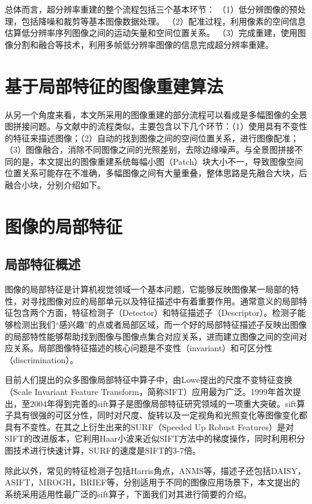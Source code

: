 总体而言，超分辨率重建的整个流程包括三个基本环节：
（1）低分辨图像的预处理，包括降噪和裁剪等基本图像数据处理。
（2）配准过程，利用像素的空间信息估算低分辨率序列图像之间的运动矢量和空间位置关系。
（3）完成重建，使用图像分割和融合等技术，利用多帧低分辨率图像的信息完成超分辨率重建。

\section{基于局部特征的图像重建算法}
从另一个角度来看，本文所采用的图像重建的部分流程可以看成是多幅图像的全景图拼接问题。与文献\cite{Brown:2006ir}中的流程类似，主要包含以下几个环节：（1）使用具有不变性的特征来描述图像；（2）自动的找到图像之间的空间位置关系，进行图像配准；（3）图像融合，消除不同图像之间的光照差别，去除边缘噪声。与全景图拼接不同的是，本文提出的图像重建系统每幅小图（Patch）块大小不一，导致图像空间位置关系可能存在不准确，多幅图像之间有大量重叠，整体思路是先融合大块，后融合小块，分别介绍如下。

\section{图像的局部特征}

\subsection{局部特征概述}
图像的局部特征是计算机视觉领域一个基本问题，它能够反映图像某一局部的特性，对寻找图像对应的局部单元以及特征描述中有着重要作用。通常意义的局部特征包含两个方面，特征检测子（Detector）和特征描述子（Descriptor）。检测子能够检测出我们“感兴趣”的点或者局部区域，而一个好的局部特征描述子反映出图像的局部特性能够帮助找到图像与图像点集合对应关系，进而建立图像之间的空间对应关系。局部图像特征描述的核心问题是不变性（invariant）和可区分性（discrimination）。

目前人们提出的众多图像局部特征中算子中，由Lowe提出的尺度不变特征变换（Scale Invariant Feature Transform，简称SIFT）应用最为广泛。1999年首次提出，至2004年得到完善\cite{Lowe:2004uq}的sift算子是图像局部特征研究领域的一项重大突破。sift算子具有很强的可区分性，同时对尺度、旋转以及一定视角和光照变化等图像变化都具有不变性。在其之上衍生出来的SURF（Speeded Up Robust Features）是对SIFT的改进版本，它利用Haar小波来近似SIFT方法中的梯度操作，同时利用积分图技术进行快速计算，SURF的速度是SIFT的3-7倍。

除此以外，常见的特征检测子包括Harris角点，ANMS等，描述子还包括DAISY，ASIFT，MROGH，BRIEF等，分别适用于不同的图像应用场景下，本文提出的系统采用适用性最广泛的sift算子，下面我们对其进行简要的介绍。

